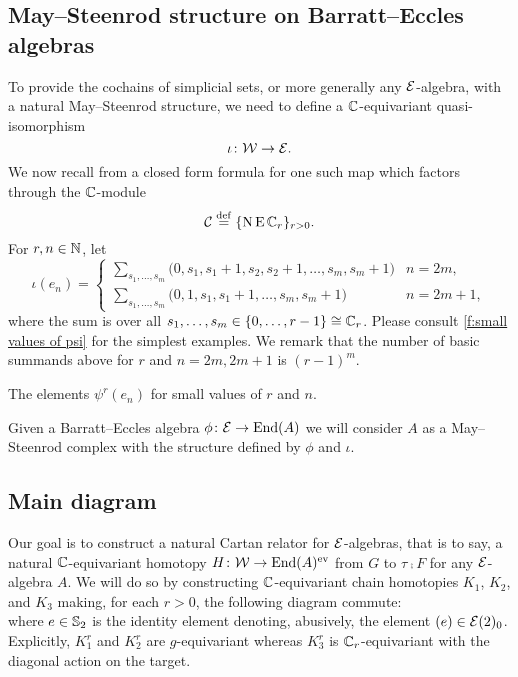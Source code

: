 \subsection{May--Steenrod structure on Barratt--Eccles algebras}\label{ss:may-steenrod on barratt-eccles}

To provide the cochains of simplicial sets, or more generally any $\mathcal{E}$-algebra, with a natural May--Steenrod structure, we need to define a $\mathbb{C}$-equivariant quasi-isomorphism
\[
\iota \colon \mathcal{W} \to \mathcal{E}.
\]
We now recall from \cite{medina2021may_st} a closed form formula for one such map which factors through the $\mathbb{C}$-module
\[
\mathcal{C} \stackrel{\mathrm{def}}{=} \{\operatorname{N}\operatorname{E}\mathbb{C}_r\}_{r>0}.
\]
For $r,n\in\mathbb{N}$, let
\begin{equation*}
	\iota(e_{n}) =
	\begin{cases}
		\displaystyle{\sum_{s_1, \dots, s_m}} \big(0, {s_1}, {s_1+1}, {s_2}, {s_2+1}, \dots, {s_{m}}, {s_{m}+1} \big) & n = 2m, \\
		\displaystyle{\sum_{s_1, \dots, s_m}} \big(0, 1, {s_1}, {s_1+1}, \dots, {s_{m}}, {s_{m}+1} \big) & n = 2m+1,
	\end{cases}
\end{equation*}
where the sum is over all $s_1, \dots, s_m \in \{0, \dots, r-1\} \cong \mathbb{C}_r$.
Please consult \cref{f:small values of psi} for the simplest examples.
We remark that the number of basic summands above for $r$ and $n = 2m, 2m + 1$ is $(r-1)^m$.

\begin{table}
	\centering
	
	\caption{The elements $\psi^r(e_n)$ for small values of $r$ and $n$.}
	\label{f:small values of psi}
\end{table}

Given a Barratt--Eccles algebra $\phi \colon \mathcal{E} \to \mathrm{End}(A)$ we will consider $A$ as a May--Steenrod complex with the structure defined by $\phi$ and $\iota$.

\subsection{Main diagram}

Our goal is to construct a natural Cartan relator for $\mathcal{E}$-algebras, that is to say, a natural $\mathbb{C}$-equivariant homotopy $H \colon \mathcal{W} \to \mathrm{End}(A)^{\mathrm{ev}}$ from $G$ to $\tau \comp F$ for any $\mathcal{E}$-algebra $A$.
We will do so by constructing $\mathbb{C}$-equivariant chain homotopies $K_1$, $K_2$, and $K_3$ making, for each $r>0$, the following diagram commute:
\begin{equation}\label{d:big diagram}
	
\end{equation}
where $e \in \mathbb{S}_2$ is the identity element denoting, abusively, the element $(e) \in \mathcal{E}(2)_0$.
Explicitly, $K_1^r$ and $K_2^r$ are $g$-equivariant whereas $K_3^r$ is $\mathbb{C}_r$-equivariant with the diagonal action on the target.

